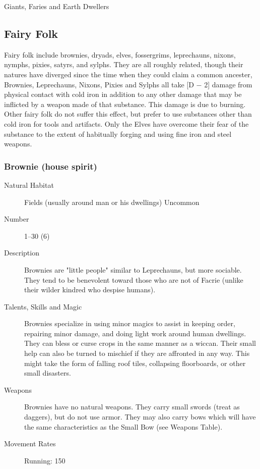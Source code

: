 \begin{mmgroup}{Giants, Faries and Earth Dwellers}
\subsection{Fairy Folk}
Fairy folk include brownies, dryads, elves, fossergrims, leprechauns,
nixons, nymphs, pixies, satyrs, and sylphs.  They are all roughly
related, though their natures have diverged since the time when they
could claim a common ancester, Brownies, Leprechauns, Nixons, Pixies
and Sylphs all take [D − 2] damage from physical contact with cold
iron in addition to any other damage that may be inflicted by a weapon
made of that substance.  This damage is due to burning. Other fairy
folk do not suffer this effect, but prefer to use substances other
than cold iron for tools and artifacts. Only the Elves have overcome
their fear of the substance to the extent of habitually forging and
using fine iron and steel weapons.

\subsubsection{Brownie (house spirit)}

\begin{description}
\item[Natural Habitat] Fields (usually around man or his dwellings) Uncommon

\item[Number] 1–30 (6)

\item[Description] Brownies are "little people" similar to Leprechauns, but
more sociable. They tend to be benevolent toward those who are not of
Facrie (unlike their wilder kindred who despise humans).

\item[Talents, Skills and Magic] Brownies specialize in using minor magics to assist in
keeping order, repairing minor damage, and doing light work around
human dwellings. They can bless or curse crops in the same manner as a
wiccan. Their small help can also be turned to mischief if they are
affronted in any way. This might take the form of falling roof tiles,
collapsing floorboards, or other small disasters.

\item[Weapons] Brownies have no natural weapons. They carry small swords
(treat as daggers), but do not use armor. They may also carry bows
which will have the same characteristics as the Small Bow (see Weapons
Table).


\item[Movement Rates] Running: 150


\end{description}
\end{mmgroup}
